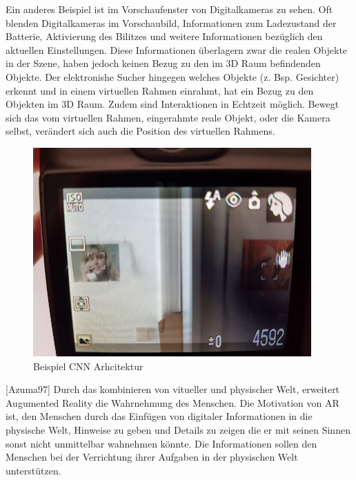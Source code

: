 Ein anderes Beispiel ist im Vorschaufenster von Digitalkameras zu sehen. Oft blenden Digitalkameras im Vorschaubild, Informationen zum Ladezustand der Batterie, Aktivierung des Bilitzes und weitere 
Informationen bezüglich den aktuellen Einstellungen. Diese Informationen überlagern zwar die realen Objekte in der Szene, haben jedoch keinen Bezug zu den im 3D Raum befindenden Objekte. 
Der elektronishe Sucher hingegen welches Objekte (z. Bsp. Gesichter) erkennt und in einem virtuellen Rahmen einrahmt, hat ein Bezug zu den Objekten im 3D Raum. Zudem sind Interaktionen in Echtzeit möglich.  
Bewegt sich das vom virtuellen Rahmen,  eingerahmte reale Objekt, oder die Kamera selbst, verändert sich auch die Position des virtuellen Rahmens. 

\begin{figure}[H]
	\centering
	\includegraphics[width=0.95\textwidth]{resources/fundamentals/example_camera_screen_ar}
	\caption{Beispiel CNN Arhcitektur \cite{typical_cnn_img}}
	\label{img:cnn_example_network}
\end{figure}

[Azuma97] Durch das kombinieren von vitueller und physischer Welt, erweitert Augumented Reality die Wahrnehmung des Menschen. Die Motivation von AR ist, den Menschen durch das Einfügen
von digitaler Informationen in die physische Welt, Hinweise zu geben und Details zu zeigen die er mit seinen Sinnen sonst nicht unmittelbar wahnehmen könnte. Die Informationen sollen den Menschen 
bei der Verrichtung ihrer Aufgaben in der physischen Welt unterstützen.

